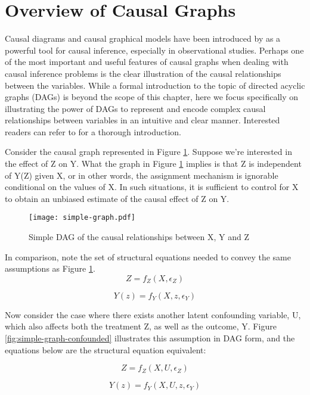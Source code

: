 \section{Overview of Causal Graphs}
\label{sec:graph-overview}

Causal diagrams and causal graphical models have been introduced by \citet{pearl_causality_2000} as a powerful tool for causal inference, especially in observational studies. 
Perhaps one of the most important and useful features of causal 
graphs when dealing with causal inference problems is the clear illustration 
of the causal relationships between the variables. 
While a formal introduction to the topic of directed acyclic graphs (DAGs) is beyond the scope of this chapter, 
here we focus specifically on illustrating the power of DAGs to represent 
and encode complex  causal relationships between variables in an intuitive and 
clear manner. 
Interested readers can refer to \citet{pearl_causality_2000} for a thorough introduction. 

Consider the causal graph represented in Figure \ref{fig:simple-graph}. 
Suppose we're interested in the effect of Z on Y. 
What the graph in Figure \ref{fig:simple-graph} implies is that Z is 
independent of Y(Z) given X, or in other words, the assignment mechanism is 
ignorable conditional on the values of X. 
In such situations, it is sufficient to control for 
X to obtain an unbiased estimate of the causal effect of Z on Y. 

\begin{figure}[h!]
   \centering
   \texttt{[image: simple-graph.pdf]}
   \caption{Simple DAG of the causal relationships between X, Y and Z}
   \label{fig:simple-graph}
\end{figure}

In comparison, note the set of structural equations needed to convey the same assumptions as Figure \ref{fig:simple-graph}. 
\[Z = f_Z(X, \epsilon_Z)  \]

\[Y(z) = f_Y(X, z, \epsilon_Y)  \]

Now consider the case where there exists another latent confounding variable, U, which also affects both the treatment Z, as well as the outcome, Y. 
Figure \ref{fig:simple-graph-confounded} illustrates this assumption in DAG form, and the equations below are the structural equation equivalent:

\[Z = f_Z(X, U, \epsilon_Z)  \]

\[Y(z) = f_Y(X, U, z, \epsilon_Y)  \]

